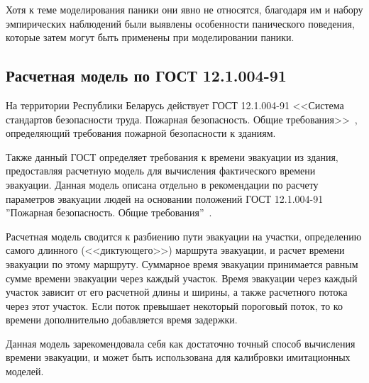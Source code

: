 Хотя к теме моделирования паники они явно не относятся, благодаря им и набору эмпирических наблюдений были выявлены особенности панического поведения,
которые затем могут быть применены при моделировании паники.


\subsection{Расчетная модель по ГОСТ 12.1.004-91}
\label{sub:overview:gost}

На территории Республики Беларусь действует ГОСТ 12.1.004-91 <<Система стандартов безопасности труда. Пожарная безопасность. Общие требования>>~\cite{gost_fire_safety},
определяющий требования пожарной безопасности к зданиям.

Также данный ГОСТ определяет требования к времени эвакуации из здания, предоставляя расчетную модель для вычисления фактического времени эвакуации.
Данная модель описана отдельно в рекомендации по расчету параметров эвакуации людей на основании положений ГОСТ 12.1.004-91 ''Пожарная безопасность. Общие требования''~\cite{model_gost}.

Расчетная модель сводится к разбиению пути эвакуации на участки, определению самого длинного (<<диктующего>>) маршрута эвакуации, и расчет времени эвакуации по этому маршруту.
Суммарное время эвакуации принимается равным сумме времени эвакуации через каждый участок.
Время эвакуации через каждый участок зависит от его расчетной длины и ширины, а также расчетного потока через этот участок.
Если поток превышает некоторый пороговый поток, то ко времени дополнительно добавляется время задержки.

Данная модель зарекомендовала себя как достаточно точный способ вычисления времени эвакуации, и может быть использована для калибровки имитационных моделей.






